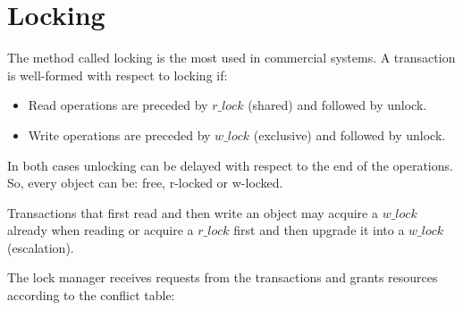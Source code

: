 \section{Locking}

The method called locking is the most used in commercial systems. A transaction is well-formed with respect to locking if: 
\begin{itemize}
    \item Read operations are preceded by $r\_lock$ (shared) and followed by unlock. 
    \item Write operations are preceded by $w\_lock$ (exclusive) and followed by unlock. 
\end{itemize}
In both cases unlocking can be delayed with respect to the end of the operations. So, every object can be: free, r-locked or w-locked. 

Transactions that first read and then write an object may acquire a $w\_lock$ already when reading or acquire a $r\_lock$ first and then upgrade it into a $w\_lock$ (escalation).

The lock manager receives requests from the transactions and grants resources according to the conflict table: 

